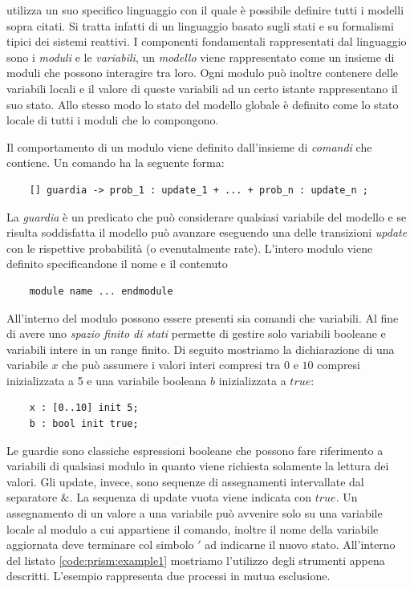 \prism{} utilizza un suo specifico linguaggio con il quale è possibile definire tutti i modelli sopra citati. Si tratta infatti di un linguaggio basato sugli stati e su formalismi tipici dei sistemi reattivi. I componenti fondamentali rappresentati dal linguaggio sono i \emph{moduli} e le \emph{variabili}, un \emph{modello} viene rappresentato come un insieme di moduli che possono interagire tra loro. Ogni modulo può inoltre contenere delle variabili locali e il valore di queste variabili ad un certo istante rappresentano il suo stato. Allo stesso modo lo stato del modello globale è definito come lo stato locale di tutti i moduli che lo compongono.

Il comportamento di un modulo viene definito dall'insieme di \emph{comandi} che contiene. Un comando ha la seguente forma:
\begin{verbatim}
	[] guardia -> prob_1 : update_1 + ... + prob_n : update_n ;
\end{verbatim}
La \emph{guardia} è un predicato che può considerare qualsiasi variabile del modello e se risulta soddisfatta il modello può avanzare eseguendo una delle transizioni \emph{update} con le rispettive probabilità (o evenutalmente rate). L'intero modulo viene definito specificandone il nome e il contenuto
\begin{verbatim}
	module name ... endmodule
\end{verbatim}
All'interno del modulo possono essere presenti sia comandi che variabili. Al fine di avere uno \emph{spazio finito di stati} \prism{} permette di gestire solo variabili booleane e variabili intere in un range finito. Di seguito mostriamo la dichiarazione di una variabile $x$ che può assumere i valori interi compresi tra $0$ e $10$ compresi inizializzata a 5 e una variabile booleana $b$ inizializzata a $true$:
\begin{verbatim}
	x : [0..10] init 5;
	b : bool init true;
\end{verbatim}
Le guardie sono classiche espressioni booleane che possono fare riferimento a variabili di qualsiasi modulo in quanto viene richiesta solamente la lettura dei valori. Gli update, invece, sono sequenze di assegnamenti intervallate dal separatore $\&$. La sequenza di update vuota viene indicata con $true$. Un assegnamento di un valore a una variabile può avvenire solo su una variabile locale al modulo a cui appartiene il comando, inoltre il nome della variabile aggiornata deve terminare col simbolo $'$ ad indicarne il nuovo stato. All'interno del listato \ref{code:prism:example1} mostriamo l'utilizzo degli strumenti appena descritti. L'esempio rappresenta due processi in mutua esclusione.
